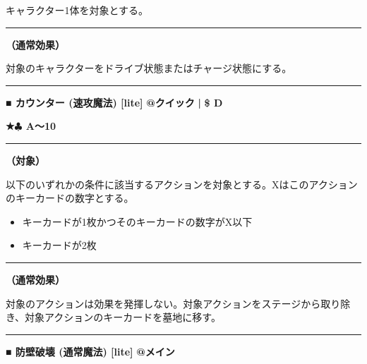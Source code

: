 \documentclass[twocolumn,a5paper,papersize,10pt]{jarticle}
\begin{document}
キャラクター1体を対象とする。
\vspace{1mm}%
\hrule height 0.1mm depth 0mm width 66.5mm %
\vspace{1mm}%

{\bf（通常効果）}

対象のキャラクターをドライブ状態またはチャージ状態にする。
\vspace{2mm} %
\hrule height 0.5mm depth 0mm width 66.5mm %
\vspace{1mm} %
{\small\bf ■ カウンター {\scriptsize (速攻魔法) [lite]}} %
\hfill 
{\footnotesize\bf @クイック }
  {\footnotesize\bf | } {\footnotesize\bf \$ D}

{\footnotesize\bf ★{\normalsize $\clubsuit$} A〜10}

\vspace{1mm}%
\hrule height 0.1mm depth 0mm width 66.5mm %
\vspace{1mm}%
{\bf（対象）}

以下のいずれかの条件に該当するアクションを対象とする。Xはこのアクションのキーカードの数字とする。


\vspace{-1zh}%
\begin{itemize}
\setlength{\leftskip}{-0.3cm}
\setlength{\parskip}{0pt} %

\item キーカードが1枚かつそのキーカードの数字がX以下

\item キーカードが2枚
\vspace{-1zh}%
\end{itemize}
\vspace{1mm}%
\hrule height 0.1mm depth 0mm width 66.5mm %
\vspace{1mm}%

{\bf（通常効果）}

対象のアクションは効果を発揮しない。対象アクションをステージから取り除き、対象アクションのキーカードを墓地に移す。
\vspace{2mm} %
\hrule height 0.5mm depth 0mm width 66.5mm %
\vspace{1mm} %
{\small\bf ■ 防壁破壊 {\scriptsize (通常魔法) [lite]}} %
\hfill 
{\footnotesize\bf @メイン }
\end{document}
